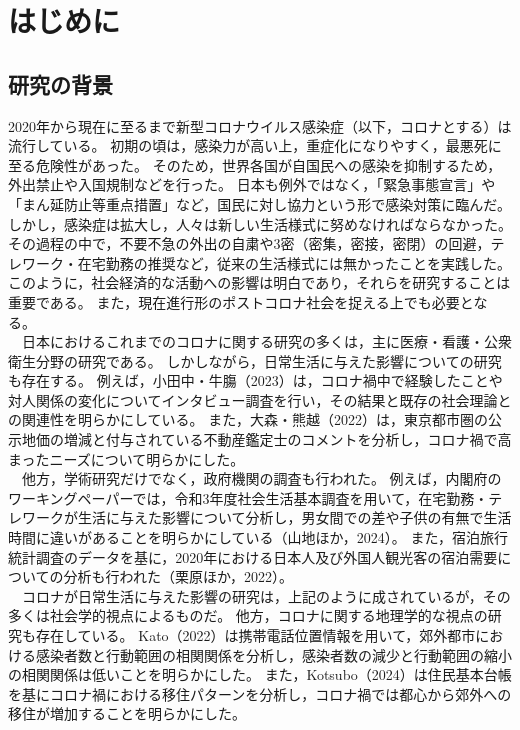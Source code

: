 \documentclass[paper={210mm,297mm},line_length=35zw,number_of_lines=31,head_space=30mm,gutter=40mm,baselineskip=2.0zw,headfoot_verticalposition=1.5zw]{jlreq} %
\begin{document}
\tableofcontents
\newpage

\section{はじめに}

\subsection{研究の背景}

2020年から現在に至るまで新型コロナウイルス感染症（以下，コロナとする）は流行している。
初期の頃は，感染力が高い上，重症化になりやすく，最悪死に至る危険性があった。
そのため，世界各国が自国民への感染を抑制するため，外出禁止や入国規制などを行った。
日本も例外ではなく，「緊急事態宣言」や「まん延防止等重点措置」など，国民に対し協力という形で感染対策に臨んだ。
しかし，感染症は拡大し，人々は新しい生活様式に努めなければならなかった。
その過程の中で，不要不急の外出の自粛や3密（密集，密接，密閉）の回避，テレワーク・在宅勤務の推奨など，従来の生活様式には無かったことを実践した。
このように，社会経済的な活動への影響は明白であり，それらを研究することは重要である。
また，現在進行形のポストコロナ社会を捉える上でも必要となる。\\
　日本におけるこれまでのコロナに関する研究の多くは，主に医療・看護・公衆衛生分野の研究である。
しかしながら，日常生活に与えた影響についての研究も存在する。
例えば，小田中・牛膓（2023）は，コロナ禍中で経験したことや対人関係の変化についてインタビュー調査を行い，その結果と既存の社会理論との関連性を明らかにしている。
また，大森・熊越（2022）は，東京都市圏の公示地価の増減と付与されている不動産鑑定士のコメントを分析し，コロナ禍で高まったニーズについて明らかにした。\\
　他方，学術研究だけでなく，政府機関の調査も行われた。
例えば，内閣府のワーキングペーパーでは，令和3年度社会生活基本調査を用いて，在宅勤務・テレワークが生活に与えた影響について分析し，男女間での差や子供の有無で生活時間に違いがあることを明らかにしている（山地ほか，2024）。
また，宿泊旅行統計調査のデータを基に，2020年における日本人及び外国人観光客の宿泊需要についての分析も行われた（栗原ほか，2022）。\\
　コロナが日常生活に与えた影響の研究は，上記のように成されているが，その多くは社会学的視点によるものだ。
他方，コロナに関する地理学的な視点の研究も存在している。
Kato（2022）は携帯電話位置情報を用いて，郊外都市における感染者数と行動範囲の相関関係を分析し，感染者数の減少と行動範囲の縮小の相関関係は低いことを明らかにした。
また，Kotsubo（2024）は住民基本台帳を基にコロナ禍における移住パターンを分析し，コロナ禍では都心から郊外への移住が増加することを明らかにした。
\end{document}
